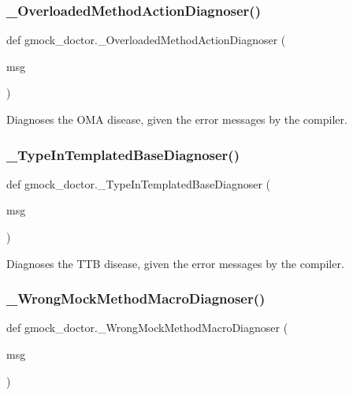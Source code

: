 \subsubsection{\texorpdfstring{\_OverloadedMethodActionDiagnoser()}{\_OverloadedMethodActionDiagnoser()}}
{\footnotesize\ttfamily def gmock\+\_\+doctor.\+\_\+\+Overloaded\+Method\+Action\+Diagnoser (\begin{DoxyParamCaption}\item[{}]{msg }\end{DoxyParamCaption})\hspace{0.3cm}{\ttfamily [private]}}

\begin{DoxyVerb}Diagnoses the OMA disease, given the error messages by the compiler.\end{DoxyVerb}
 \mbox{\label{namespacegmock__doctor_ac4e4908d4e43ef87f522365e99ec36c8}} 
\subsubsection{\texorpdfstring{\_TypeInTemplatedBaseDiagnoser()}{\_TypeInTemplatedBaseDiagnoser()}}
{\footnotesize\ttfamily def gmock\+\_\+doctor.\+\_\+\+Type\+In\+Templated\+Base\+Diagnoser (\begin{DoxyParamCaption}\item[{}]{msg }\end{DoxyParamCaption})\hspace{0.3cm}{\ttfamily [private]}}

\begin{DoxyVerb}Diagnoses the TTB disease, given the error messages by the compiler.\end{DoxyVerb}
 \mbox{\label{namespacegmock__doctor_a430611c0e038abaa33ae320b7118779b}} 
\subsubsection{\texorpdfstring{\_WrongMockMethodMacroDiagnoser()}{\_WrongMockMethodMacroDiagnoser()}}
{\footnotesize\ttfamily def gmock\+\_\+doctor.\+\_\+\+Wrong\+Mock\+Method\+Macro\+Diagnoser (\begin{DoxyParamCaption}\item[{}]{msg }\end{DoxyParamCaption})\hspace{0.3cm}{\ttfamily [private]}}

